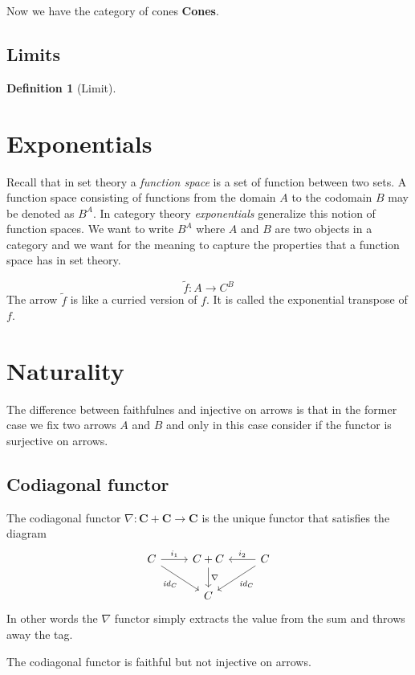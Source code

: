 \documentclass{book}
\theoremstyle{definition}
\newtheorem{definition}{Definition}[section]
\newcommand\id{\mathit{id}}
\begin{document}
Now we have the category of cones \textbf{Cones}.

\subsection{Limits}

\begin{definition}[Limit]
\end{definition}

\section{Exponentials}

Recall that in set theory a \emph{function space} is a set of function between
two sets. A function space consisting of functions from the domain $A$ to the
codomain $B$ may be denoted as $B^{A}$. In category theory \emph{exponentials}
generalize this notion of function spaces. We want to write $B^{A}$ where $A$
and $B$ are two objects in a category and we want for the meaning to capture the
properties that a function space has in set theory.

\[
  \tilde{f} : A \to C^{B}
\]
The arrow $\tilde{f}$ is like a curried version of $f$. It is called the
exponential transpose of $f$.

\section{Naturality}

The difference between faithfulnes and injective on arrows is that in the former
case we fix two arrows $A$ and $B$ and only in this case consider if the functor
is surjective on arrows.

\subsection{Codiagonal functor}

The codiagonal functor $\nabla : \mathbf{C} + \mathbf{C} \to \mathbf{C}$ is the unique
functor that satisfies the diagram
\[
  \begin{tikzcd}
    C \ar[r, "i_{1}"] \ar[dr, "\id_{C}"'] & C + C \ar[d, "\nabla"] & C \ar[l, "i_{2}"'] \ar[dl, "\id_{C}"] \\
    & C
  \end{tikzcd}
\]
In other words the $\nabla$ functor simply extracts the value from the sum and throws
away the tag.

The codiagonal functor is faithful but not injective on arrows.
\end{document}
